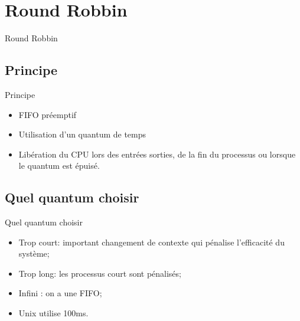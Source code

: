 \def\sectitle{Round Robbin}
\section{\sectitle}

\begin{frame}{\sectitle}
\def\subsectitle{Principe}
\subsection{\subsectitle}

\begin{exampleblock}{\subsectitle}
\begin{itemize}
    \item FIFO préemptif
    \item Utilisation d'un quantum de temps
    \item Libération du CPU lors des entrées sorties, de la fin du processus ou
    lorsque le quantum est épuisé.
\end{itemize}
\end{exampleblock}

\def\subsectitle{Quel quantum choisir}
\subsection{\subsectitle}

\begin{alertblock}{\subsectitle}
\begin{itemize}
    \item Trop court: important changement de contexte qui pénalise l'efficacité
    du système;
    \item Trop long: les processus court sont pénalisés;
    \item Infini : on a une FIFO;
    \item Unix utilise 100ms.
\end{itemize}
\end{alertblock}

\end{frame}

\def\sectitle{Files multiples}

